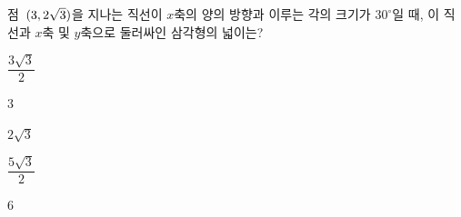 점~$(3{,}\mkern3mu\mathopen{}2\sqrt{3})$을 지나는 직선이 $x$축의 양의 방향과 이루는 각의 크기가 $30^\circ$일 때, 이 직선과 $x$축 및 $y$축으로 둘러싸인 삼각형의 넓이는?
\begin{choices32}{\rule[-3ex]{0pt}{8ex}$\dfrac{3\sqrt{3}}{2}$}{\rule[-3ex]{0pt}{8ex}$3$}{\rule[-3ex]{0pt}{8ex}$2\sqrt{3}$}{\rule[-3ex]{0pt}{8ex}$\dfrac{5\sqrt{3}}{2}$}{\rule[-3ex]{0pt}{8ex}$6$}\end{choices32}
